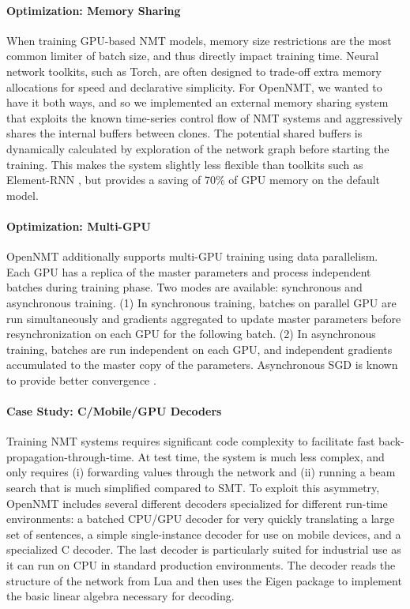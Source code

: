 \documentclass[11pt]{article}
\begin{document}
\paragraph{Optimization: Memory Sharing}

When training GPU-based NMT models, memory size restrictions are the
most common limiter of batch size, and thus directly impact training
time. Neural network toolkits, such as Torch, are often designed to
trade-off extra memory allocations for speed and declarative
simplicity. For OpenNMT, we wanted to have it both ways, and so we
implemented an external memory sharing system that exploits the known
time-series control flow of NMT systems and aggressively shares the
internal buffers between clones. The potential shared buffers is dynamically
calculated by exploration of the network graph before starting the
training.  This makes the system slightly less flexible than toolkits
such as Element-RNN \cite{DBLP:journals/corr/LeonardWW15ss}, but
provides a saving of 70\% of GPU memory on the default model. 

\paragraph{Optimization: Multi-GPU} OpenNMT additionally supports multi-GPU
training using data parallelism. Each GPU has a replica of the master parameters
 and process independent batches during training phase.
Two modes are available: synchronous and asynchronous training.
(1) In synchronous training, batches on parallel GPU are run simultaneously and gradients 
aggregated to update master parameters before resynchronization on each GPU for the following batch.
(2) In asynchronous training, batches are run independent on each GPU, and independent gradients accumulated 
to the master copy of the parameters. Asynchronous SGD is known to provide better convergence \cite{dean2012large}.

\paragraph{Case Study: C/Mobile/GPU Decoders} Training NMT
systems requires significant code complexity to facilitate fast
back-propagation-through-time. At test time, the
system is much less complex, and only requires (i) forwarding values
through the network and (ii) running a beam search that is much
simplified compared to SMT. To exploit this asymmetry, OpenNMT includes
several different decoders specialized for different run-time
environments: a batched CPU/GPU decoder for very quickly translating a
large set of sentences, a simple single-instance decoder for use on
mobile devices, and a specialized C decoder. The last decoder is
particularly suited for industrial use as it can run on CPU in standard
production environments. The decoder reads the structure of the
network from Lua and then uses the Eigen package to implement the
basic linear algebra necessary for decoding. 
\end{document}
